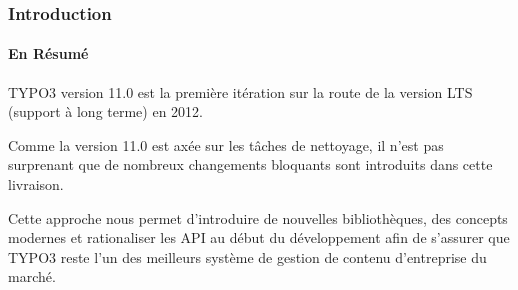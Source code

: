 %

\begin{frame}[fragile]
	\frametitle{Introduction}
	\framesubtitle{En Résumé}

	\small
		TYPO3 version 11.0 est la première itération sur la route de la version LTS
		(support à long terme) en 2012.

		\vspace{0.2cm}

		Comme la version 11.0 est axée sur les tâches de nettoyage, il n'est pas
		surprenant que de nombreux changements bloquants sont introduits dans cette livraison.

		\vspace{0.2cm}

		Cette approche nous permet d'introduire de nouvelles bibliothèques, des concepts
		modernes et rationaliser les API au début du développement afin de s'assurer que
		TYPO3 reste l'un des meilleurs système de gestion de contenu d'entreprise du marché.

		\vspace{0.2cm}

	\normalsize

\end{frame}

